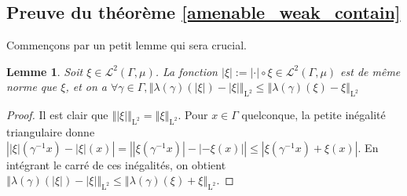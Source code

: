 \documentclass[a4paper,12pt]{article}
\newtheorem{lemma}[theorem]{Lemme}
\newcommand{\norm}[1]{\left\Vert #1\right\Vert}
\newcommand{\abs}[1]{\left\vert#1\right\vert}
\newcommand{\inv}{^{-1}}
\newcommand{\comp}{\circ}
\begin{document}
\subsection{Preuve du théorème \ref{amenable_weak_contain}}

Commençons par un petit lemme qui sera crucial.

\begin{lemma}\label{abs_trick}
    Soit $\xi\in\mathscr{L}^2(\Gamma, \mu)$. La fonction $\abs{\xi} := \abs{\cdot}\comp\xi \in\mathscr{L}^2(\Gamma, \mu)$ est de même norme 
    que $\xi$, et on a $\forall\gamma\in\Gamma, \norm{\lambda(\gamma)(\abs{\xi}) - \abs{\xi}}_{\mathrm{L}^2} \le \norm{\lambda(\gamma)(\xi) - \xi}_{\mathrm{L}^2}$
\end{lemma}

\begin{proof}
    Il est clair que $\norm{\abs{\xi}}_{\mathrm{L}^2} = \norm{\xi}_{\mathrm{L}^2}$. Pour $x\in\Gamma$ quelconque, 
    la petite inégalité triangulaire donne $\abs{\abs{\xi}(\gamma\inv x) - \abs{\xi}(x)} = \abs{\abs{\xi(\gamma\inv x)} - \abs{- \xi(x)}} \leq \abs{\xi(\gamma\inv x) + \xi(x)}$. En intégrant le carré de ces inégalités,
    on obtient $\norm{\lambda(\gamma)(\abs{\xi}) - \abs{\xi}}_{\mathrm{L}^2} \leq \norm{\lambda(\gamma)(\xi) + \xi}_{\mathrm{L}^2}$.
\end{proof}
\end{document}
